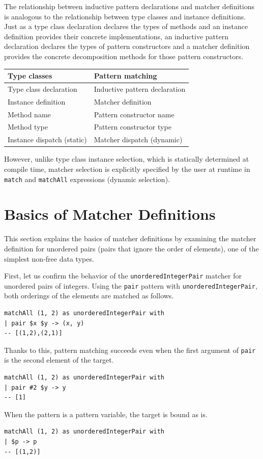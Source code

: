 The relationship between inductive pattern declarations and matcher definitions is analogous to the relationship between type classes and instance definitions.
Just as a type class declaration declares the types of methods and an instance definition provides their concrete implementations, an inductive pattern declaration declares the types of pattern constructors and a matcher definition provides the concrete decomposition methods for those pattern constructors.

\medskip
\begin{center}
\begin{tabular}{ll}
\hline
\textbf{Type classes} & \textbf{Pattern matching} \\
\hline
Type class declaration & Inductive pattern declaration \\
Instance definition & Matcher definition \\
Method name & Pattern constructor name \\
Method type & Pattern constructor type \\
Instance dispatch (static) & Matcher dispatch (dynamic) \\
\hline
\end{tabular}
\end{center}
\medskip

However, unlike type class instance selection, which is statically determined at compile time, matcher selection is explicitly specified by the user at runtime in \lstinline{match} and \lstinline{matchAll} expressions (dynamic selection).

\section{Basics of Matcher Definitions}\label{matcher-basic}

This section explains the basics of matcher definitions by examining the matcher definition for unordered pairs (pairs that ignore the order of elements), one of the simplest non-free data types.

First, let us confirm the behavior of the \lstinline{unorderedIntegerPair} matcher for unordered pairs of integers.
Using the \lstinline{pair} pattern with \lstinline{unorderedIntegerPair}, both orderings of the elements are matched as follows.
\begin{lstlisting}[language=egison,numbers=none]
matchAll (1, 2) as unorderedIntegerPair with
| pair $x $y -> (x, y)
-- [(1,2),(2,1)]
\end{lstlisting}
Thanks to this, pattern matching succeeds even when the first argument of \lstinline{pair} is the second element of the target.
\begin{lstlisting}[language=egison,numbers=none]
matchAll (1, 2) as unorderedIntegerPair with
| pair #2 $y -> y
-- [1]
\end{lstlisting}
When the pattern is a pattern variable, the target is bound as is.
\begin{lstlisting}[language=egison,numbers=none]
matchAll (1, 2) as unorderedIntegerPair with
| $p -> p
-- [(1,2)]
\end{lstlisting}


